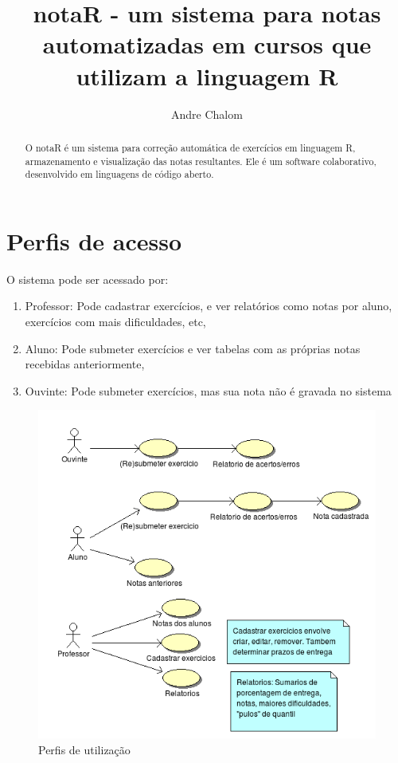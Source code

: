 \documentclass[12pt,a4paper]{article}
\begin{document}
\title{notaR - um sistema para notas automatizadas em cursos que utilizam
	a linguagem R}
\author{Andre Chalom}
\maketitle

\begin{abstract}
O notaR \'e um sistema para corre\c c\~ao autom\'atica de exerc\'icios em
linguagem R, armazenamento e visualiza\c c\~ao das notas resultantes. Ele
\'e um software colaborativo, desenvolvido em linguagens de c\'odigo aberto.
\end{abstract}
\section{Perfis de acesso}
O sistema pode ser acessado por:
\begin{enumerate}
	\item Professor: Pode cadastrar exerc\'icios, e ver relat\'orios como
			notas por aluno, exerc\'icios com mais dificuldades, etc,
	\item Aluno: Pode submeter exerc\'icios e ver tabelas com as pr\'oprias
			notas recebidas anteriormente,
	\item Ouvinte: Pode submeter exerc\'icios, mas sua nota n\~ao \'e
			gravada no sistema
\end{enumerate}
\begin{figure}[htbp]
		\begin{center}
				\includegraphics[scale=0.50]{model/utilizacao.png}
		\end{center}
		\caption{Perfis de utiliza\c c\~ao}
		\label{fig:utilizacao}
\end{figure}
\end{document}
